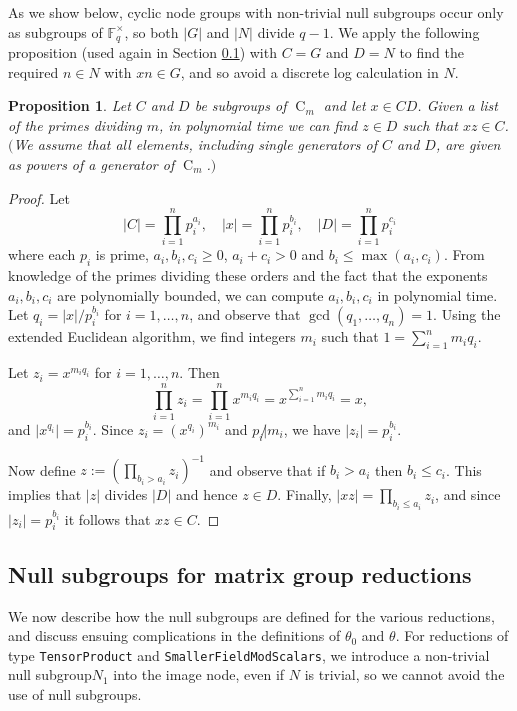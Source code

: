 \documentclass[12pt,twoside,reqno,psamsfonts]{amsproc}
\newcommand{\nullsubgp}{{null subgroup}\xspace}
\numberwithin{equation}{section}
\numberwithin{figure}{section}
\newcounter{algorithm}
\theoremstyle{plain}
\newtheorem{pr}[thm]{Proposition}
\theoremstyle{definition}
\theoremstyle{remark}
\providecommand{\abs}[1]{\left\lvert #1 \right\rvert}
\newcommand{\field}[1]{\mathbb{#1}}
\newcommand{\F}{\field{F}}
\DeclareMathOperator{\Cent}{C}
\begin{document}
As we show below, cyclic node groups with non-trivial {\nullsubgp}s
occur only as subgroups of $\F_q^{\times}$, so 
both $\abs{G}$ and $\abs{N}$ divide $q-1$.  
We apply the following proposition (used
again in Section \ref{nullmatgpred})
with $C=G$ and $D=N$ to find the required
$n \in N$ with $xn \in G$,
and so avoid a discrete log calculation in $N$.
 
\begin{pr}
\label{pr:scalar_patch}
Let $C$ and $D$ be subgroups of $\Cent_m$ and let $x \in CD$. Given a list of the primes
dividing $m$, in polynomial time we can find $z \in D$ such that $xz \in C$.
$($We assume that all elements, including single generators of $C$ and $D$,
are given as powers of a generator of $\Cent_m$.$)$
\end{pr}
\begin{proof}
Let
\[
\abs{C} = \prod_{i = 1}^n p_i^{a_i},\quad
\abs{x} = \prod_{i = 1}^n p_i^{b_i},\quad
\abs{D} = \prod_{i = 1}^n p_i^{c_i}
\]
where each $p_i$ is prime, $a_i, b_i, c_i \geqslant 0$, $a_i +
c_i > 0$ and $b_i \leqslant \max(a_i, c_i)$.
From knowledge of the primes dividing these orders and the fact that
the exponents $a_i,b_i,c_i$ are polynomially bounded, we can compute
$a_i,b_i,c_i$ in polynomial time.
Let $q_i = \abs{x} /
p_i^{b_i}$ for $i = 1, \dotsc, n$, and observe that $\gcd(q_1, \dotsc,
q_n) = 1$. Using the extended Euclidean algorithm, we 
find integers $m_i$ such that $1 = \sum_{i = 1}^n m_i q_i$.

Let $z_i = x^{m_i q_i}$ for $i = 1, \dotsc, n$. Then
  \[ \prod_{i = 1}^n z_i = \prod_{i = 1}^n x^{m_i q_i} =
  x^{\sum_{i = 1}^n m_i q_i} = x, \]
and $\abs{x^{q_i}} = p_i^{b_i}$.
Since $z_i = (x^{q_i})^{m_i}$ and $p_i \not| m_i$, we have $\abs{z_i} =
p_i^{b_i}$.

Now define
$ z := (\prod_{b_i > a_i} z_i)^{-1} $ and observe that if $b_i > a_i$
then $b_i \leqslant c_i$. This implies that $\abs{z}$ divides $\abs{D}$ and hence
$z \in D$.  Finally, $\abs{x z} = \prod_{b_i \leqslant a_i} z_i$, and since
$\abs{z_i} = p_i^{b_i}$ it follows that $x z \in C$.
\end{proof}

\subsection{Null subgroups for matrix group reductions}
\label{nullmatgpred}
We now describe how the {\nullsubgp}s %
are defined for the various reductions, 
and discuss ensuing complications in the definitions of
$\theta_0$ and $\theta$.  For reductions of type
{\tt TensorProduct} and {\tt SmallerFieldModScalars}, we introduce a
non-trivial \nullsubgp $N_1$ into the image node, even if $N$
is trivial, so we cannot avoid the use of {\nullsubgp}s.
\end{document}
